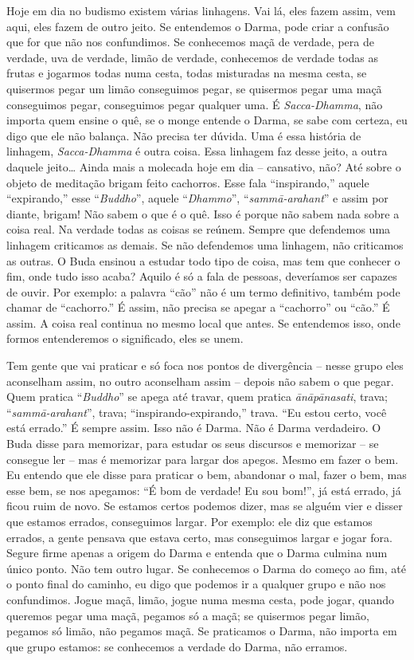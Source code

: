 Hoje em dia no budismo existem várias linhagens. Vai lá, eles fazem
assim, vem aqui, eles fazem de outro jeito. Se entendemos o Darma, pode
criar a confusão que for que não nos confundimos. Se conhecemos maçã de
verdade, pera de verdade, uva de verdade, limão de verdade, conhecemos
de verdade todas as frutas e jogarmos todas numa cesta, todas
misturadas na mesma cesta, se quisermos pegar um limão conseguimos
pegar, se quisermos pegar uma maçã conseguimos pegar, conseguimos pegar
qualquer uma. É \textit{Sacca-Dhamma}, não importa quem ensine o quê,
se o monge entende o Darma, se sabe com certeza, eu digo que ele não
balança. Não precisa ter dúvida. Uma é essa história de linhagem,
\textit{Sacca-Dhamma} é outra coisa. Essa linhagem faz desse jeito, a
outra daquele jeito\ldots{} Ainda mais a molecada hoje em dia – cansativo,
não? Até sobre o objeto de meditação brigam feito cachorros. Esse fala
“inspirando,” aquele “expirando,” esse “\textit{Buddho}”, aquele
“\textit{Dhammo}”, “\textit{sammā-arahant}” e assim por diante,
brigam! Não sabem o que é o quê. Isso é porque não sabem nada sobre a
coisa real. Na verdade todas as coisas se reúnem. Sempre que defendemos
uma linhagem criticamos as demais. Se não defendemos uma linhagem, não
criticamos as outras. O Buda ensinou a estudar todo tipo de coisa, mas
tem que conhecer o fim, onde tudo isso acaba? Aquilo é só a fala de
pessoas, deveríamos ser capazes de ouvir. Por exemplo: a palavra “cão”
não é um termo definitivo, também pode chamar de “cachorro.” É assim,
não precisa se apegar a “cachorro” ou “cão.” É assim. A coisa real
continua no mesmo local que antes. Se entendemos isso, onde formos
entenderemos o significado, eles se unem. 

Tem gente que vai praticar e só foca nos pontos de divergência –
nesse grupo eles aconselham assim, no outro aconselham assim – depois
não sabem o que pegar. Quem pratica “\textit{Buddho}” se apega até
travar, quem pratica \textit{ānāpānasati}, trava;
“\textit{sammā-arahant}”, trava; “inspirando-expirando,” trava. “Eu
estou certo, você está errado.” É sempre assim. Isso não é Darma. Não é
Darma verdadeiro. O Buda disse para memorizar, para estudar os seus
discursos e memorizar – se consegue ler – mas é memorizar para largar
dos apegos. Mesmo em fazer o bem. Eu entendo que ele disse para
praticar o bem, abandonar o mal, fazer o bem, mas esse bem, se nos
apegamos: “É bom de verdade! Eu sou bom!”, já está errado, já ficou
ruim de novo. Se estamos certos podemos dizer, mas se alguém vier e
disser que estamos errados, conseguimos largar. Por exemplo: ele diz
que estamos errados, a gente pensava que estava certo, mas conseguimos
largar e jogar fora. Segure firme apenas a origem do Darma e entenda
que o Darma culmina num único ponto. Não tem outro lugar. Se conhecemos
o Darma do começo ao fim, até o ponto final do caminho, eu digo que
podemos ir a qualquer grupo e não nos confundimos. Jogue maçã, limão,
jogue numa mesma cesta, pode jogar, quando queremos pegar uma maçã,
pegamos só a maçã; se quisermos pegar limão, pegamos só limão, não
pegamos maçã. Se praticamos o Darma, não importa em que grupo estamos:
se conhecemos a verdade do Darma, não erramos. 

